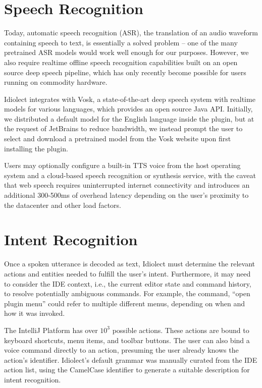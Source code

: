 \documentclass[conference]{IEEEtran}
\begin{document}
\section{Speech Recognition}

Today, automatic speech recognition (ASR), the translation of an audio waveform containing speech to text, is essentially a solved problem -- one of the many pretrained ASR models would work well enough for our purposes. However, we also require realtime offline speech recognition capabilities built on an open source deep speech pipeline, which has only recently become possible for users running on commodity hardware.

Idiolect integrates with Vosk, a state-of-the-art deep speech system with realtime models for various languages, which provides an open source Java API. Initially, we distributed a default model for the English language inside the plugin, but at the request of JetBrains to reduce bandwidth, we instead prompt the user to select and download a pretrained model from the Vosk website upon first installing the plugin.


Users may optionally configure a built-in TTS voice from the host operating system and a cloud-based speech recognition or synthesis service, with the caveat that web speech requires uninterrupted internet connectivity and introduces an additional 300-500ms of overhead latency depending on the user's proximity to the datacenter and other load factors.

\section{Intent Recognition}

Once a spoken utterance is decoded as text, Idiolect must determine the relevant actions and entities needed to fulfill the user's intent. Furthermore, it may need to consider the IDE context, i.e., the current editor state and command history, to resolve potentially ambiguous commands. For example, the command, ``open plugin menu'' could refer to multiple different menus, depending on when and how it was invoked.

The IntelliJ Platform has over $10^3$ possible actions. These actions are bound to keyboard shortcuts, menu items, and toolbar buttons. The user can also bind a voice command directly to an action, presuming the user already knows the action's identifier. Idiolect's default grammar was manually curated from the IDE action list, using the CamelCase identifier to generate a suitable description for intent recognition.
\end{document}
